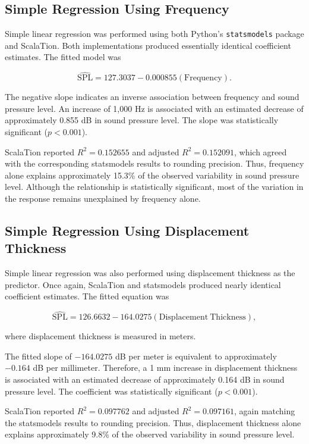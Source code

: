 \subsection{Simple Regression Using Frequency}

Simple linear regression was performed using both Python's
\texttt{statsmodels} package and ScalaTion. Both implementations produced
essentially identical coefficient estimates. The fitted model was

\[
\widehat{\mathrm{SPL}}
=
127.3037 - 0.000855(\mathrm{Frequency}).
\]

The negative slope indicates an inverse association between frequency and
sound pressure level. An increase of 1,000 Hz is associated with an estimated
decrease of approximately 0.855 dB in sound pressure level. The slope was
statistically significant ($p<0.001$).

ScalaTion reported $R^2=0.152655$ and adjusted $R^2=0.152091$, which agreed
with the corresponding statsmodels results to rounding precision. Thus,
frequency alone explains approximately 15.3\% of the observed variability in
sound pressure level. Although the relationship is statistically significant,
most of the variation in the response remains unexplained by frequency alone.

\subsection{Simple Regression Using Displacement Thickness}

Simple linear regression was also performed using displacement thickness as
the predictor. Once again, ScalaTion and statsmodels produced nearly identical
coefficient estimates. The fitted equation was

\[
\widehat{\mathrm{SPL}}
=
126.6632 - 164.0275(\mathrm{Displacement\ Thickness}),
\]

where displacement thickness is measured in meters.

The fitted slope of $-164.0275$ dB per meter is equivalent to approximately
$-0.164$ dB per millimeter. Therefore, a 1 mm increase in displacement
thickness is associated with an estimated decrease of approximately 0.164 dB
in sound pressure level. The coefficient was statistically significant
($p<0.001$).

ScalaTion reported $R^2=0.097762$ and adjusted $R^2=0.097161$, again matching
the statsmodels results to rounding precision. Thus, displacement thickness
alone explains approximately 9.8\% of the observed variability in sound
pressure level.

